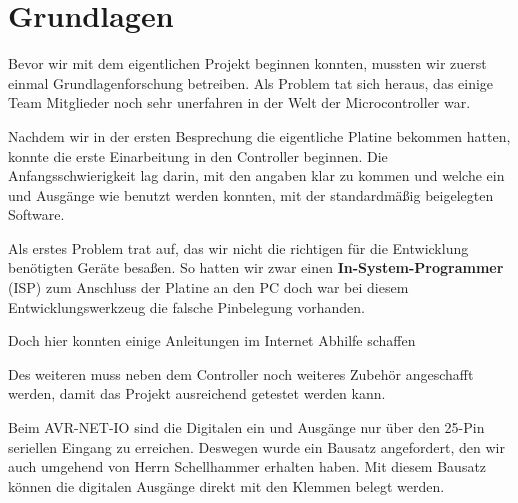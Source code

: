 \chapter{Grundlagen}

Bevor wir mit dem eigentlichen Projekt beginnen konnten, 
mussten wir zuerst einmal Grundlagenforschung betreiben.
Als Problem tat sich heraus, das einige Team Mitglieder
noch sehr unerfahren in der Welt der Microcontroller war.

Nachdem wir in der ersten Besprechung die eigentliche Platine bekommen hatten,
konnte die erste Einarbeitung in den Controller beginnen.
Die Anfangsschwierigkeit lag darin, mit den angaben klar zu kommen 
und welche ein und Ausgänge wie benutzt werden konnten, mit der 
standardmäßig beigelegten Software.

Als erstes Problem trat auf, das wir nicht die richtigen für die
Entwicklung benötigten Geräte besaßen.
So hatten wir zwar einen \textbf{In-System-Programmer} (ISP) zum 
Anschluss der Platine an den PC doch war bei diesem Entwicklungswerkzeug
die falsche Pinbelegung vorhanden.

Doch hier konnten einige Anleitungen im Internet Abhilfe schaffen

Des weiteren muss neben dem Controller noch weiteres Zubehör angeschafft werden,
damit das Projekt ausreichend getestet werden kann.

Beim AVR-NET-IO sind die Digitalen ein und Ausgänge nur über den 25-Pin seriellen Eingang zu erreichen.
Deswegen wurde ein Bausatz angefordert, den wir auch umgehend von Herrn Schellhammer erhalten haben.
Mit diesem Bausatz können die digitalen Ausgänge direkt mit den Klemmen belegt werden.


